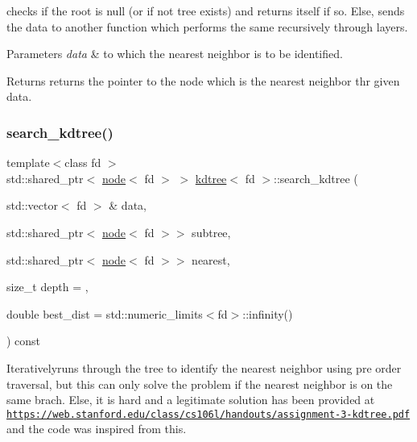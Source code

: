 checks if the root is null (or if not tree exists) and returns itself if so. Else, sends the data to another function which performs the same recursively through layers. 


\begin{DoxyParams}{Parameters}
{\em data} & to which the nearest neighbor is to be identified. \\
\hline
\end{DoxyParams}
\begin{DoxyReturn}{Returns}
returns the pointer to the node which is the nearest neighbor thr given data. 
\end{DoxyReturn}
\mbox{\label{classkdtree_aeb2f70117e2c254f9e7dc7e23376fa30}} 
\subsubsection{\texorpdfstring{search\+\_\+kdtree()}{search\_kdtree()}\hspace{0.1cm}{\footnotesize\ttfamily [2/2]}}
{\footnotesize\ttfamily template$<$class fd $>$ \\
std\+::shared\+\_\+ptr$<$ \hyperlink{classnode}{node}$<$ fd $>$ $>$ \hyperlink{classkdtree}{kdtree}$<$ fd $>$\+::search\+\_\+kdtree (\begin{DoxyParamCaption}\item[{std\+::vector$<$ fd $>$ \&}]{data,  }\item[{std\+::shared\+\_\+ptr$<$ \hyperlink{classnode}{node}$<$ fd $>$$>$}]{subtree,  }\item[{std\+::shared\+\_\+ptr$<$ \hyperlink{classnode}{node}$<$ fd $>$$>$}]{nearest,  }\item[{size\+\_\+t}]{depth = {},  }\item[{double}]{best\+\_\+dist = {\ttfamily std\+:\+:numeric\+\_\+limits$<$fd$>$\+:\+:infinity()} }\end{DoxyParamCaption}) const}



Iterativelyruns through the tree to identify the nearest neighbor using pre order traversal, but this can only solve the problem if the nearest neighbor is on the same brach. Else, it is hard and a legitimate solution has been provided at \href{https://web.stanford.edu/class/cs106l/handouts/assignment-3-kdtree.pdf}{\tt https\+://web.\+stanford.\+edu/class/cs106l/handouts/assignment-\/3-\/kdtree.\+pdf} and the code was inspired from this. 


